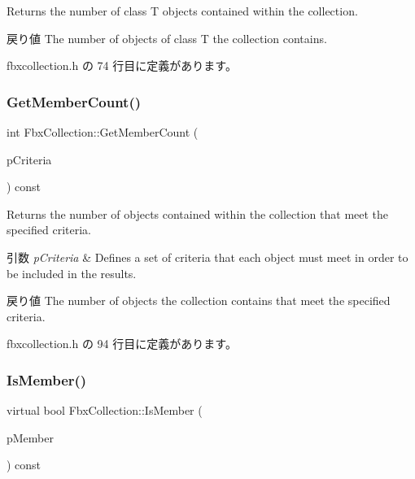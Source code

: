 Returns the number of class T objects contained within the collection. \begin{DoxyReturn}{戻り値}
The number of objects of class T the collection contains. 
\end{DoxyReturn}


 fbxcollection.\+h の 74 行目に定義があります。

\mbox{\label{class_fbx_collection_ab885c6a1cc7eb77b471ae11c65658258}} 
\subsubsection{\texorpdfstring{Get\+Member\+Count()}{GetMemberCount()}\hspace{0.1cm}{\footnotesize\ttfamily [3/3]}}
{\footnotesize\ttfamily int Fbx\+Collection\+::\+Get\+Member\+Count (\begin{DoxyParamCaption}\item[{const \hyperlink{class_fbx_criteria}{Fbx\+Criteria} \&}]{p\+Criteria }\end{DoxyParamCaption}) const\hspace{0.3cm}{\ttfamily [inline]}}

Returns the number of objects contained within the collection that meet the specified criteria. 
\begin{DoxyParams}{引数}
{\em p\+Criteria} & Defines a set of criteria that each object must meet in order to be included in the results. \\
\hline
\end{DoxyParams}
\begin{DoxyReturn}{戻り値}
The number of objects the collection contains that meet the specified criteria. 
\end{DoxyReturn}


 fbxcollection.\+h の 94 行目に定義があります。

\mbox{\label{class_fbx_collection_a988fd0dcbe61e4b9b165d6830543f49e}} 
\subsubsection{\texorpdfstring{Is\+Member()}{IsMember()}}
{\footnotesize\ttfamily virtual bool Fbx\+Collection\+::\+Is\+Member (\begin{DoxyParamCaption}\item[{const \hyperlink{class_fbx_object}{Fbx\+Object} $\ast$}]{p\+Member }\end{DoxyParamCaption}) const\hspace{0.3cm}{\ttfamily [virtual]}}

